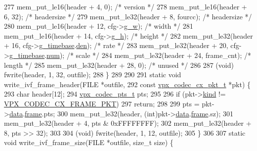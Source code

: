 \begin{DoxyCodeInclude}
{{277   mem\_put\_le16(header + 4,  0);                 \textcolor{comment}{/* version */}
278   mem\_put\_le16(header + 6,  32);                \textcolor{comment}{/* headersize */}
279   mem\_put\_le32(header + 8,  fourcc);            \textcolor{comment}{/* headersize */}
280   mem\_put\_le16(header + 12, cfg->\hyperlink{structvpx__codec__enc__cfg_a5c165f5b41ca1158f2883983a2b7709c}{g\_w});          \textcolor{comment}{/* width */}
281   mem\_put\_le16(header + 14, cfg->\hyperlink{structvpx__codec__enc__cfg_a4132bd89ce85bce7c08f2cc3b6f2b82e}{g\_h});          \textcolor{comment}{/* height */}
282   mem\_put\_le32(header + 16, cfg->\hyperlink{structvpx__codec__enc__cfg_a6498d378e4c29ef3e22258289e481087}{g\_timebase}.\hyperlink{structvpx__rational_a29dd2ab4001377b3aa21885ef969759f}{den}); \textcolor{comment}{/* rate */}
283   mem\_put\_le32(header + 20, cfg->\hyperlink{structvpx__codec__enc__cfg_a6498d378e4c29ef3e22258289e481087}{g\_timebase}.\hyperlink{structvpx__rational_ae7774f21a22c9bef3aa73156c79f4731}{num}); \textcolor{comment}{/* scale */}
284   mem\_put\_le32(header + 24, frame\_cnt);         \textcolor{comment}{/* length */}
285   mem\_put\_le32(header + 28, 0);                 \textcolor{comment}{/* unused */}
286 
287   (void) fwrite(header, 1, 32, outfile);
288 \}
289 
290 
291 \textcolor{keyword}{static} \textcolor{keywordtype}{void} write\_ivf\_frame\_header(FILE *outfile,
292                                    \textcolor{keyword}{const} \hyperlink{structvpx__codec__cx__pkt}{vpx\_codec\_cx\_pkt\_t} *pkt) \{
293   \textcolor{keywordtype}{char}             header[12];
294   \hyperlink{group__encoder_ga7e711b0a71c65aef8f0faea8bd57b05f}{vpx\_codec\_pts\_t}  pts;
295 
296   \textcolor{keywordflow}{if} (pkt->\hyperlink{structvpx__codec__cx__pkt_a41f395b39516343c1329a4a85a0084f2}{kind} != \hyperlink{group__encoder_gga28a79375279536526552af3a83d2ed72a2261aae5594289400e812fb1e6b6b0cc}{VPX\_CODEC\_CX\_FRAME\_PKT})
297     \textcolor{keywordflow}{return};
298 
299   pts = pkt->\hyperlink{structvpx__codec__cx__pkt_a7f97b060a23b7e89fe5b885c0074f696}{data}.\hyperlink{structvpx__codec__cx__pkt_a81e33bf4408a3983abb16492fee359ff}{frame}.pts;
300   mem\_put\_le32(header, (\textcolor{keywordtype}{int})pkt->\hyperlink{structvpx__codec__cx__pkt_a7f97b060a23b7e89fe5b885c0074f696}{data}.\hyperlink{structvpx__codec__cx__pkt_a81e33bf4408a3983abb16492fee359ff}{frame}.sz);
301   mem\_put\_le32(header + 4, pts & 0xFFFFFFFF);
302   mem\_put\_le32(header + 8, pts >> 32);
303 
304   (void) fwrite(header, 1, 12, outfile);
305 \}
306 
307 \textcolor{keyword}{static} \textcolor{keywordtype}{void} write\_ivf\_frame\_size(FILE *outfile, \textcolor{keywordtype}{size\_t} size) \{
}}
\end{DoxyCodeInclude}
